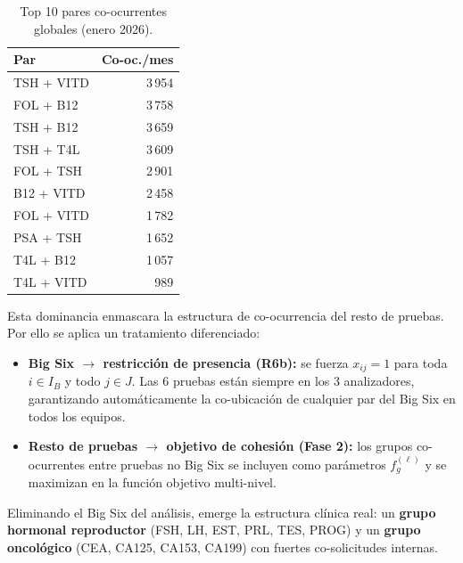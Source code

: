 \documentclass[12pt, a4paper]{article}
\begin{document}
\begin{table}[H]
\centering
\caption{Top 10 pares co-ocurrentes globales (enero 2026).}
\begin{tabular}{lr}
\toprule
\textbf{Par} & \textbf{Co-oc./mes} \\
\midrule
TSH + VITD & 3\,954 \\
FOL + B12  & 3\,758 \\
TSH + B12  & 3\,659 \\
TSH + T4L  & 3\,609 \\
FOL + TSH  & 2\,901 \\
B12 + VITD & 2\,458 \\
FOL + VITD & 1\,782 \\
PSA + TSH  & 1\,652 \\
T4L + B12  & 1\,057 \\
T4L + VITD &   989  \\
\bottomrule
\end{tabular}
\end{table}

Esta dominancia enmascara la estructura de co-ocurrencia del resto de pruebas. Por ello se
aplica un tratamiento diferenciado:
\begin{itemize}
  \item \textbf{Big Six $\to$ restricción de presencia (R6b):} se fuerza $x_{ij}=1$ para
        toda $i \in I_B$ y todo $j \in J$. Las 6 pruebas están siempre en los 3
        analizadores, garantizando automáticamente la co-ubicación de cualquier par del
        Big Six en todos los equipos.
  \item \textbf{Resto de pruebas $\to$ objetivo de cohesión (Fase 2):} los grupos
        co-ocurrentes entre pruebas no Big Six se incluyen como parámetros $f_g^{(\ell)}$
        y se maximizan en la función objetivo multi-nivel.
\end{itemize}

Eliminando el Big Six del análisis, emerge la estructura clínica real: un
\textbf{grupo hormonal reproductor} (FSH, LH, EST, PRL, TES, PROG) y un
\textbf{grupo oncológico} (CEA, CA125, CA153, CA199) con fuertes co-solicitudes internas.
\end{document}
